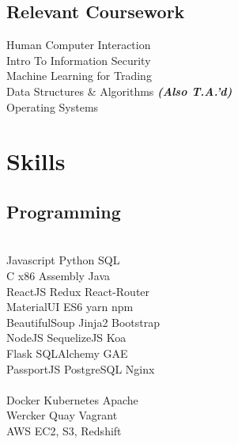 \documentclass[]{deedy-resume-openfont}
\begin{document}
\begin{minipage}[t]{0.31\textwidth}
\subsection{Relevant Coursework}
Human Computer Interaction \\
Intro To Information Security \\
Machine Learning for Trading \\
Data Structures \& Algorithms {\footnotesize \textit{\textbf{(Also T.A.'d) }}} \\
Operating Systems
\\[1\baselineskip]


\section{Skills}
\subsection{Programming}
\\[1\baselineskip]

Javascript \textbullet{} Python \textbullet{} SQL
\\[1\baselineskip]

 C \textbullet{} x86 Assembly \textbullet{} Java
\\[1\baselineskip]

ReactJS \textbullet{} Redux \textbullet{} React-Router \\
MaterialUI \textbullet{} ES6 \textbullet{} yarn \textbullet{} npm \\
BeautifulSoup \textbullet{} Jinja2 \textbullet{} Bootstrap
\\[1\baselineskip]

NodeJS \textbullet{} SequelizeJS \textbullet{} Koa\\
Flask \textbullet{} SQLAlchemy \textbullet{} GAE\\
PassportJS \textbullet{} PostgreSQL \textbullet{} Nginx \\
\\[1\baselineskip]

Docker \textbullet{} Kubernetes \textbullet{} Apache \\
Wercker \textbullet{}  Quay \textbullet{} Vagrant \\
AWS EC2, S3, Redshift
\\[1\baselineskip]


\end{minipage}
\end{document}
